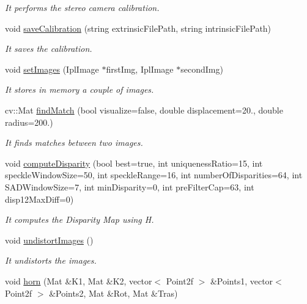 \begin{DoxyCompactItemize}
\begin{DoxyCompactList}\small\item\em It performs the stereo camera calibration. \end{DoxyCompactList}\item 
void \hyperlink{classStereoCamera_a9f06cd4b170ad0ba45b681ee93d64851}{save\+Calibration} (string extrinsic\+File\+Path, string intrinsic\+File\+Path)
\begin{DoxyCompactList}\small\item\em It saves the calibration. \end{DoxyCompactList}\item 
void \hyperlink{classStereoCamera_a5e24f7d17a11adb4a6310df7f7e2de5b}{set\+Images} (Ipl\+Image $\ast$first\+Img, Ipl\+Image $\ast$second\+Img)
\begin{DoxyCompactList}\small\item\em It stores in memory a couple of images. \end{DoxyCompactList}\item 
cv\+::\+Mat \hyperlink{classStereoCamera_aeb1cf4e41058cd70c7df6b8c2511548d}{find\+Match} (bool visualize=false, double displacement=20., double radius=200.)
\begin{DoxyCompactList}\small\item\em It finds matches between two images. \end{DoxyCompactList}\item 
void \hyperlink{classStereoCamera_a79e986f2970bb2c5b5acd1ede65984aa}{compute\+Disparity} (bool best=true, int uniqueness\+Ratio=15, int speckle\+Window\+Size=50, int speckle\+Range=16, int number\+Of\+Disparities=64, int S\+A\+D\+Window\+Size=7, int min\+Disparity=0, int pre\+Filter\+Cap=63, int disp12\+Max\+Diff=0)
\begin{DoxyCompactList}\small\item\em It computes the Disparity Map using H. \end{DoxyCompactList}\item 
void \hyperlink{classStereoCamera_a2751f357e5fabc7099303d45425208d7}{undistort\+Images} ()
\begin{DoxyCompactList}\small\item\em It undistorts the images. \end{DoxyCompactList}\item 
void \hyperlink{classStereoCamera_adf155975709fdbf09d3133899d074a02}{horn} (Mat \&K1, Mat \&K2, vector$<$ Point2f $>$ \&Points1, vector$<$ Point2f $>$ \&Points2, Mat \&Rot, Mat \&Tras)

\end{DoxyCompactItemize}

